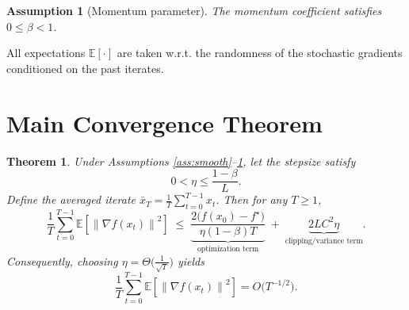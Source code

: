 \documentclass{article}
\newtheorem{theorem}{Theorem}
\newtheorem{assumption}{Assumption}
\newcommand{\EE}{\mathbb{E}}
\newcommand{\norm}[1]{\left\|#1\right\|}
\begin{document}
\begin{assumption}[Momentum parameter]\label{ass:beta}
The momentum coefficient satisfies $0\le\beta<1$.
\end{assumption}

All expectations $\EE[\cdot]$ are taken w.r.t. the randomness of the stochastic gradients conditioned on the past iterates.

\section*{Main Convergence Theorem}
\begin{theorem}\label{thm:main}
Under Assumptions \ref{ass:smooth}–\ref{ass:beta}, let the stepsize satisfy
\[
0<\eta\le\frac{1-\beta}{L}.
\tag{T1}
\]
Define the averaged iterate $\bar x_{T}= \frac{1}{T}\sum_{t=0}^{T-1}x_{t}$.  
Then for any $T\ge 1$,
\[
\frac{1}{T}\sum_{t=0}^{T-1}\EE\!\left[\norm{\nabla f(x_{t})}^{2}\right]
\;\le\;
\underbrace{\frac{2\bigl(f(x_{0})-f^{\star}\bigr)}{\eta(1-\beta)T}}_{\text{optimization term}}
\;+\;
\underbrace{2L C^{2}\eta}_{\text{clipping/variance term}}.
\tag{T2}
\]
Consequently, choosing $\eta = \Theta\!\bigl(\tfrac{1}{\sqrt{T}}\bigr)$ yields
\[
\frac{1}{T}\sum_{t=0}^{T-1}\EE\!\left[\norm{\nabla f(x_{t})}^{2}\right]=O\!\bigl(T^{-1/2}\bigr).
\]
\end{theorem}
\end{document}
